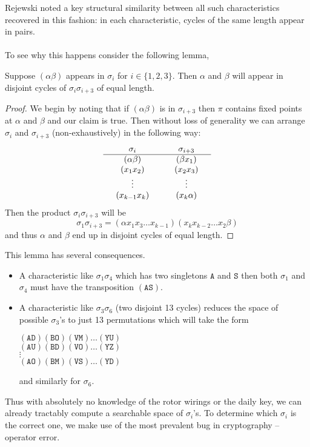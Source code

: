 Rejewski noted a key structural similarity between all such
characteristics recovered in this fashion: in each characteristic,
cycles of the same length appear in pairs.
\\\\To see why this happens consider the following lemma,
\begin{lemma}
	\label{cillies}
	Suppose $(\alpha\beta)$ appears in $\sigma_i$ for $i\in\{1,2,3\}$.
	Then $\alpha$ and $\beta$ will appear in disjoint cycles of
	$\sigma_i\sigma_{i+3}$ of equal length.
\end{lemma}
\begin{proof}
	We begin by noting that if $(\alpha\beta)$ is in $\sigma_{i+3}$
	then $\pi$ contains fixed points at $\alpha$ and $\beta$ and our
	claim is true. Then without loss of generality we can arrange
	$\sigma_{i}$ and $\sigma_{i+3}$ (non-exhaustively) in the following way:
	\[
		\setlength{\arraycolsep}{15pt}
		\begin{array}{cc}
			\sigma_i      & \sigma_{i+3} \\
			\hline
			(\alpha\beta) & (\beta x_1)  \\
			(x_1 x_2)     & (x_2 x_3)    \\
			\vdots        & \vdots       \\
			(x_{k-1} x_k) & (x_k \alpha)
		\end{array}
	\]
	Then the product $\sigma_i\sigma_{i+3}$ will be
	\[
		\sigma_1\sigma_{i+3} = (\alpha x_1 x_3 \dots x_{k-1} )(x_k
		x_{k-2} \dots x_2 \beta)
	\]
	and thus $\alpha$ and $\beta$ end up in disjoint cycles of equal length.
\end{proof}

This lemma has several consequences.
\begin{itemize}
	\item A characteristic like $\sigma_1\sigma_4$ which has two
	      singletons $\texttt{A}$ and $\texttt{S}$ then both $\sigma_1$ and
	      $\sigma_4$ must have the transposition $(\texttt{AS})$.
	\item A characteristic like $\sigma_3\sigma_6$ (two disjoint 13
	      cycles) reduces the space of possible $\sigma_3$'s to just 13
	      permutations which will take the form
	      \begin{center}
		      $(\texttt{AD})(\texttt{BO})(\texttt{VM})\dots(\texttt{YU})$ \\
		      $(\texttt{AU})(\texttt{BD})(\texttt{VO})\dots(\texttt{YZ})$ \\
		      $\vdots$                                       \\
		      $(\texttt{AO})(\texttt{BM})(\texttt{VS})\dots(\texttt{YD})$
	      \end{center}
	      and similarly for $\sigma_6$.
\end{itemize}
Thus with absolutely no knowledge of the rotor wirings or the daily
key, we can already tractably compute a searchable space of
$\sigma_i$'s. To determine which $\sigma_i$ is the correct one, we
make use of the most prevalent bug in cryptography -- operator error.

